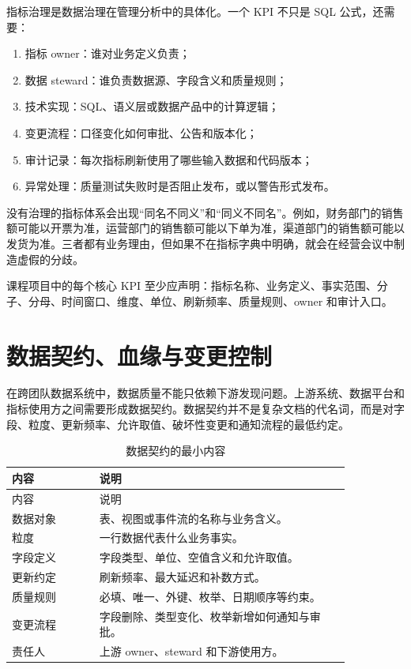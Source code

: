 \documentclass[UTF8,fontset=fandol,openany,zihao=-4]{ctexbook}
\begin{document}
指标治理是数据治理在管理分析中的具体化。一个 KPI 不只是 SQL 公式，还需要：
\begin{enumerate}
  \item 指标 owner：谁对业务定义负责；
  \item 数据 steward：谁负责数据源、字段含义和质量规则；
  \item 技术实现：SQL、语义层或数据产品中的计算逻辑；
  \item 变更流程：口径变化如何审批、公告和版本化；
  \item 审计记录：每次指标刷新使用了哪些输入数据和代码版本；
  \item 异常处理：质量测试失败时是否阻止发布，或以警告形式发布。
\end{enumerate}

没有治理的指标体系会出现“同名不同义”和“同义不同名”。例如，财务部门的销售额可能以开票为准，运营部门的销售额可能以下单为准，渠道部门的销售额可能以发货为准。三者都有业务理由，但如果不在指标字典中明确，就会在经营会议中制造虚假的分歧。

\begin{convention}[指标治理最小约定]
课程项目中的每个核心 KPI 至少应声明：指标名称、业务定义、事实范围、分子、分母、时间窗口、维度、单位、刷新频率、质量规则、owner 和审计入口。
\end{convention}

\section{数据契约、血缘与变更控制}

在跨团队数据系统中，数据质量不能只依赖下游发现问题。上游系统、数据平台和指标使用方之间需要形成数据契约。数据契约并不是复杂文档的代名词，而是对字段、粒度、更新频率、允许取值、破坏性变更和通知流程的最低约定。

\begin{longtable}{>{\raggedright\arraybackslash}p{0.22\linewidth}>{\raggedright\arraybackslash}p{0.63\linewidth}}
\caption{数据契约的最小内容}\\
\toprule
内容 & 说明\\
\midrule
\endfirsthead
\toprule
内容 & 说明\\
\midrule
\endhead
数据对象 & 表、视图或事件流的名称与业务含义。\\
粒度 & 一行数据代表什么业务事实。\\
字段定义 & 字段类型、单位、空值含义和允许取值。\\
更新约定 & 刷新频率、最大延迟和补数方式。\\
质量规则 & 必填、唯一、外键、枚举、日期顺序等约束。\\
变更流程 & 字段删除、类型变化、枚举新增如何通知与审批。\\
责任人 & 上游 owner、steward 和下游使用方。\\
\bottomrule
\end{longtable}
\end{document}
